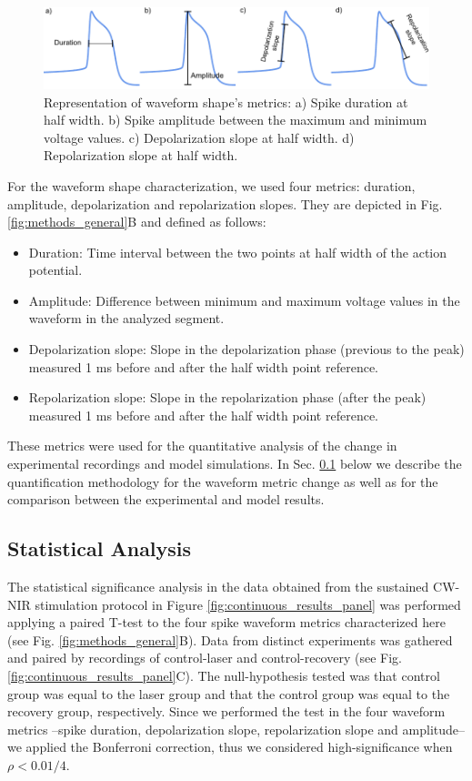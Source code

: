 \begin{figure}[htb!]
	\includegraphics[width=\textwidth]{img/laser/spike_metrics.pdf}
	\caption{Representation of waveform shape's metrics: a) Spike duration at half width. b) Spike amplitude between the maximum and minimum voltage values. c) Depolarization slope at half width. d) Repolarization slope at half width.}
	\label{fig:spike metrics}
\end{figure}


For the waveform shape characterization, we used four metrics: duration, amplitude, depolarization and repolarization slopes. They are depicted in Fig. \ref{fig:methods_general}B and defined as follows:
\begin{itemize}
	\item Duration: Time interval between the two points at half width of the action potential. 
	\item Amplitude: Difference between minimum and maximum voltage values in the waveform in the analyzed segment. 
	\item Depolarization slope: Slope in the depolarization phase (previous to the peak) measured 1 ms before and after the half width point reference.
	\item Repolarization slope: Slope in the repolarization phase (after the peak) measured 1 ms before and after the half width point reference.
\end{itemize}

These metrics were used for the quantitative analysis of the change in experimental recordings and model simulations. In Sec. \ref{sect:statistical_analysis} below we describe the quantification methodology for the waveform metric change as well as for the comparison between the experimental and model results.



\subsection{Statistical Analysis}
\label{sect:statistical_analysis}
The statistical significance analysis in the data obtained from the sustained CW-NIR stimulation protocol in Figure \ref{fig:continuous_results_panel} was performed applying a paired T-test to the four spike waveform metrics characterized here (see Fig. \ref{fig:methods_general}B). Data from distinct experiments was gathered and paired by recordings of control-laser and control-recovery (see Fig. \ref{fig:continuous_results_panel}C). The null-hypothesis tested was that control group was equal to the laser group and that the control group was equal to the recovery group, respectively. Since we performed the test in the four waveform metrics --spike duration, depolarization slope, repolarization slope and amplitude-- we applied the Bonferroni correction, thus we considered high-significance when $\rho < 0.01/4$.

